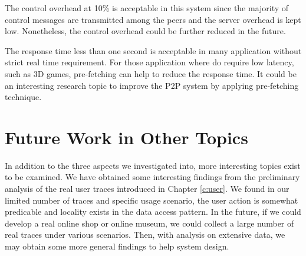 The control overhead at 10\% is acceptable in this system since the majority of
control messages are transmitted among the peers and the server overhead is kept low. 
Nonetheless, the control overhead could be further reduced in the future. 

The response time less than one second is acceptable in many application without 
strict real time requirement. For those application where do require low latency, such
as 3D games, pre-fetching can help to reduce the response time. It could be an interesting 
research topic to improve the P2P system by applying pre-fetching technique. %



\section{Future Work in Other Topics}
In addition to the three aspects we investigated into, more interesting topics exist to be examined.
We have obtained some interesting findings from the preliminary analysis of the real user
traces introduced in Chapter \ref{c:user}. 
We found in our limited number of traces and specific usage scenario, 
the user action is somewhat predicable and locality exists in the data access pattern.
In the future, if we could develop a real online shop or online museum, 
we could collect a large number of real traces under
various scenarios. Then, with analysis on extensive data, 
we may obtain some more general findings to help system design.

